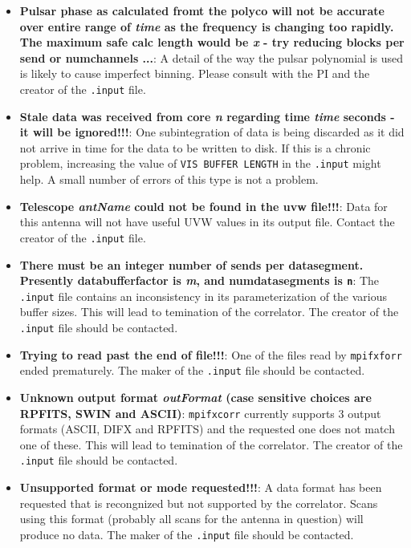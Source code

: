 \begin{itemize}
\item {\bf Pulsar phase as calculated fromt the polyco will not be accurate over entire range of {\it time} as the frequency is changing too rapidly.  The maximum safe calc length would be {\it x} - try reducing blocks per send or numchannels ...}:
A detail of the way the pulsar polynomial is used is likely to cause imperfect binning.
Please consult with the PI and the creator of the {\tt .input} file.

\item {\bf Stale data was received from core {\it n} regarding time {\it time} seconds - it will be ignored!!!}:
One subintegration of data is being discarded as it did not arrive in time for the data to be written to disk.
If this is a chronic problem, increasing the value of {\tt VIS BUFFER LENGTH} in the {\tt .input} might help.
A small number of errors of this type is not a problem.

\item {\bf Telescope {\it antName} could not be found in the uvw file!!!}:
Data for this antenna will not have useful UVW values in its output file.
Contact the creator of the {\tt .input} file.

\item {\bf There must be an integer number of sends per datasegment.  Presently databufferfactor is {\it m}, and numdatasegments is {\tt n}}:
The {\tt .input} file contains an inconsistency in its parameterization of the various buffer sizes.
This will lead to temination of the correlator.
The creator of the {\tt .input} file should be contacted.

\item {\bf Trying to read past the end of file!!!}:
One of the files read by {\tt mpifxforr} ended prematurely.
The maker of the {\tt .input} file should be contacted.

\item {\bf Unknown output format {\it outFormat} (case sensitive choices are RPFITS, SWIN and ASCII)}:
{\tt mpifxcorr} currently supports 3 output formats (ASCII, DIFX and RPFITS) and the requested one does not match one of these.  
This will lead to temination of the correlator.
The creator of the {\tt .input} file should be contacted.

\item {\bf Unsupported format or mode requested!!!}:
A data format has been requested that is recongnized but not supported by the correlator.
Scans using this format (probably all scans for the antenna in question) will produce no data.
The maker of the {\tt .input} file should be contacted.


\end{itemize}
